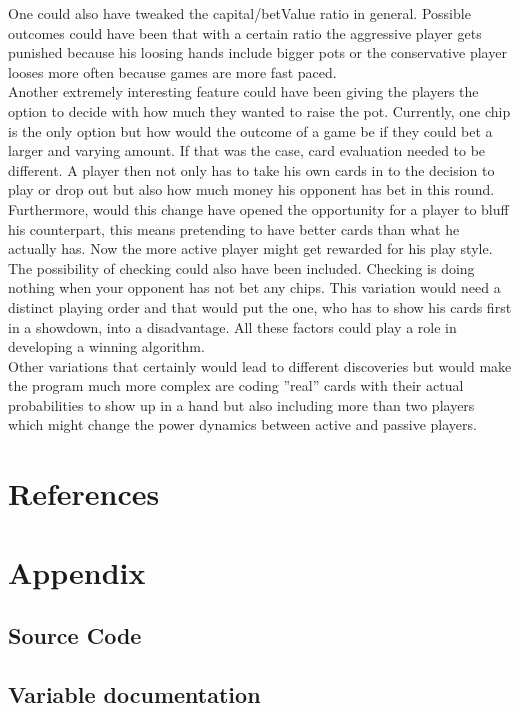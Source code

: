 \documentclass[11pt]{article}
\begin{document}
One could also have tweaked the capital/betValue ratio in general. Possible outcomes could have been that with a certain ratio the aggressive player gets punished because his loosing hands include bigger pots or the conservative player looses more often because games are more fast paced.\\

Another extremely interesting feature could have been giving the players the option to decide with how much they wanted to raise the pot. Currently, one chip is the only option but how would the outcome of a game be if they could bet a larger and varying amount. If that was the case, card evaluation needed to be different. A player then not only has to take his own cards in to the decision to play or drop out but also how much money his opponent has bet in this round. Furthermore, would this change have opened the opportunity for a player to bluff his counterpart, this means pretending to have better cards than what he actually has. Now the more active player might get rewarded for his play style.\\

The possibility of checking could also have been included. Checking is doing nothing when your opponent has not bet any chips. This variation would need a distinct playing order and that would put the  one, who has to show his cards first in a showdown, into a disadvantage. All these factors could play a role in developing a winning algorithm.\\

Other variations that certainly would lead to different discoveries but would make the program much more complex are coding ''real'' cards with their actual probabilities to show up in a hand but also including more than two players which might change the power dynamics between active and passive players.


\section{References}

\section{Appendix}
\subsection{Source Code}
\subsection{Variable documentation}
\end{document}
